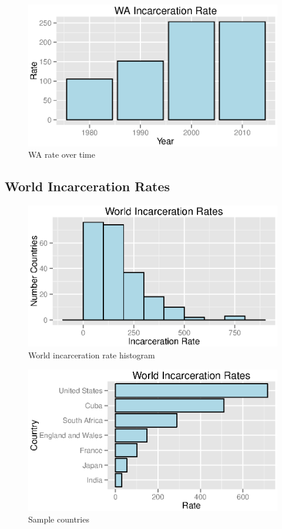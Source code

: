 \documentclass{exam}
\begin{document}
  \begin{figure}[H]
    \centering
    \includegraphics[scale = 0.9]{figures/wa_rate_over_time.eps}
    \caption{WA rate over time}
  \end{figure}

  \subsection{World Incarceration Rates}
  \begin{figure}[H]
    \centering
    \includegraphics[scale = 0.9]{figures/wold_histogram.eps}
    \caption{World incarceration rate histogram}
  \end{figure}

  \begin{figure}[H]
    \centering
    \includegraphics[scale = 0.9]{figures/sample_world_rates.eps}
    \caption{Sample countries}
  \end{figure}
\end{document}
